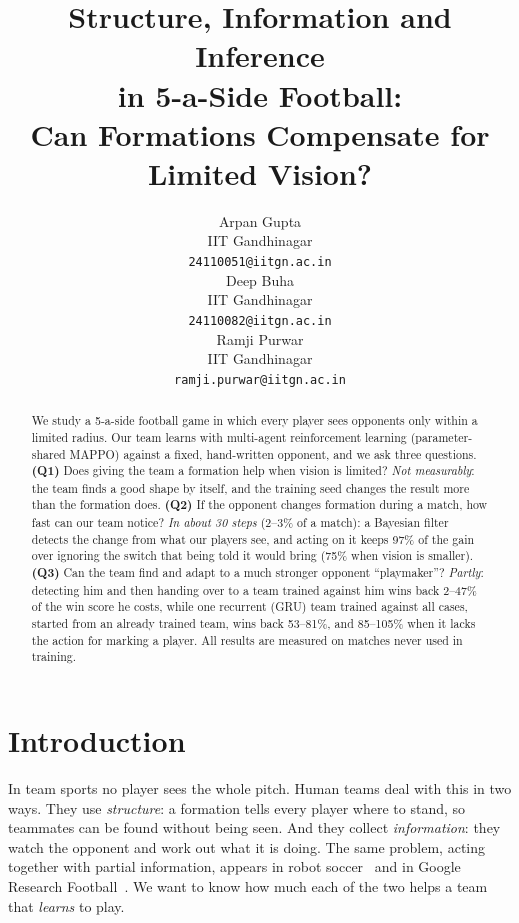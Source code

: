 \documentclass{article}
\title{Structure, Information and Inference\\
in 5-a-Side Football:\\
Can Formations Compensate for Limited Vision?}
\author{
  Arpan Gupta \\
  IIT Gandhinagar \\
  \texttt{24110051@iitgn.ac.in} \\
  \And
  Deep Buha \\
  IIT Gandhinagar \\
  \texttt{24110082@iitgn.ac.in} \\
  \And
  Ramji Purwar \\
  IIT Gandhinagar \\
  \texttt{ramji.purwar@iitgn.ac.in} \\
}
\begin{document}
\maketitle

\begin{abstract}
We study a 5-a-side football game in which every player sees opponents only within a limited radius. Our team learns
with multi-agent reinforcement learning (parameter-shared MAPPO) against a fixed, hand-written opponent, and we ask
three questions. \textbf{(Q1)} Does giving the team a formation help when vision is limited? \emph{Not measurably}:
the team finds a good shape by itself, and the training seed changes the result more than the formation does.
\textbf{(Q2)} If the opponent changes formation during a match, how fast can our team notice? \emph{In about 30
steps} (2--3\% of a match): a Bayesian filter detects the change from what our players see, and acting on it keeps 97\%
of the gain over ignoring the switch that being told it would bring (75\% when vision is smaller). \textbf{(Q3)} Can the team find and adapt to a much stronger opponent ``playmaker''? \emph{Partly}:
detecting him and then handing over to a team trained against him wins back 2--47\% of the win score he costs, while
one recurrent (GRU) team trained against all cases, started from an already trained team, wins back 53--81\%, and
85--105\% when it lacks the action for marking a player. All results are measured on matches never used in training.
\end{abstract}


\section{Introduction}
\label{sec:intro}

In team sports no player sees the whole pitch. Human teams deal with this in two ways. They use \emph{structure}: a
formation tells every player where to stand, so teammates can be found without being seen. And they collect
\emph{information}: they watch the opponent and work out what it is doing. The same problem, acting together with
partial information, appears in robot soccer~\cite{kitano1997robocup} and in Google Research
Football~\cite{kurach2020grf,song2023grf}. We want to know how much each of the two helps a team that \emph{learns}
to play.
\end{document}
